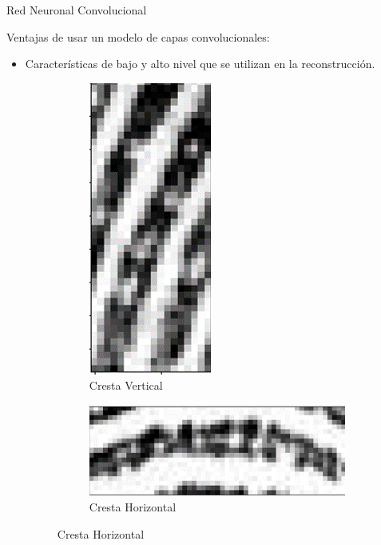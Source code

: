 \documentclass[12pt,aspectratio=169]{beamer}
\begin{document}
\begin{frame}{Red Neuronal Convolucional}

    Ventajas de usar un modelo de capas convolucionales:
    \vspace{5mm}
    
    \begin{itemize}
        \item Características de bajo y alto nivel que se utilizan en la reconstrucción.
        \vspace{4mm}
        
        \begin{figure}[h]
            \begin{subfigure}{0.18\textwidth}
                \centering
                \includegraphics[scale=0.16]{figs/fll_0.png}  
                \caption{Cresta Vertical}
            \end{subfigure}
            \begin{subfigure}{0.18\textwidth}
                \centering
                \includegraphics[scale=0.16]{figs/fll_1.png}  
                \caption{Cresta Horizontal}
            \end{subfigure}

\end{figure}
\end{itemize}
\end{frame}
\end{document}
